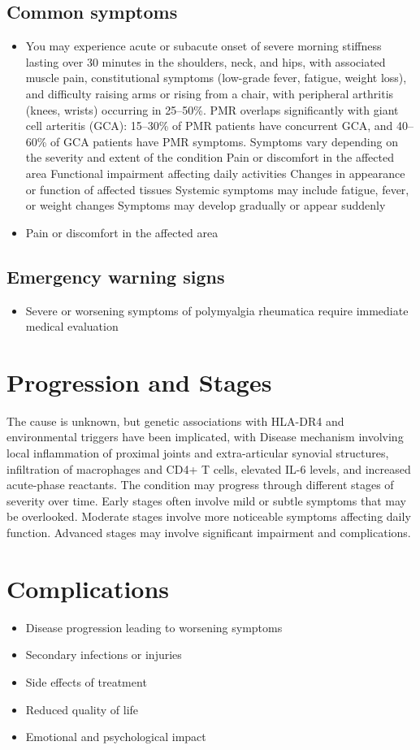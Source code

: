 \subsection{Common symptoms}
\begin{itemize}[noitemsep]
  \item You may experience acute or subacute onset of severe morning stiffness lasting over 30 minutes in the shoulders, neck, and hips, with associated muscle pain, constitutional symptoms (low-grade fever, fatigue, weight loss), and difficulty raising arms or rising from a chair, with peripheral arthritis (knees, wrists) occurring in 25--50\%. PMR overlaps significantly with giant cell arteritis (GCA): 15--30\% of PMR patients have concurrent GCA, and 40--60\% of GCA patients have PMR symptoms. Symptoms vary depending on the severity and extent of the condition Pain or discomfort in the affected area Functional impairment affecting daily activities Changes in appearance or function of affected tissues Systemic symptoms may include fatigue, fever, or weight changes Symptoms may develop gradually or appear suddenly
  \item Pain or discomfort in the affected area
  \end{itemize}

\subsection{Emergency warning signs}
\begin{itemize}[noitemsep]
  \item Severe or worsening symptoms of polymyalgia rheumatica require immediate medical evaluation
\end{itemize}
\section{Progression and Stages}
The cause is unknown, but genetic associations with HLA-DR4 and environmental triggers have been implicated, with Disease mechanism involving local inflammation of proximal joints and extra-articular synovial structures, infiltration of macrophages and CD4+ T cells, elevated IL-6 levels, and increased acute-phase reactants. The condition may progress through different stages of severity over time. Early stages often involve mild or subtle symptoms that may be overlooked. Moderate stages involve more noticeable symptoms affecting daily function. Advanced stages may involve significant impairment and complications.
\section{Complications}
\begin{itemize}[noitemsep]
  \item Disease progression leading to worsening symptoms
  \item Secondary infections or injuries
  \item Side effects of treatment
  \item Reduced quality of life
  \item Emotional and psychological impact
\end{itemize}
